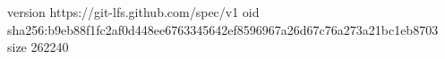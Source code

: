 version https://git-lfs.github.com/spec/v1
oid sha256:b9eb88f1fc2af0d448ee6763345642ef8596967a26d67c76a273a21bc1eb8703
size 262240
